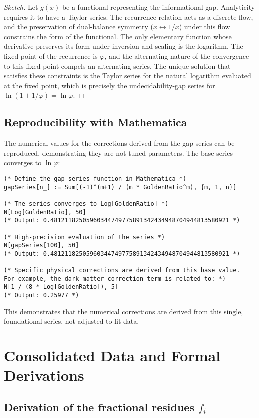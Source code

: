 \begin{proof}[Sketch]
Let $g(x)$ be a functional representing the informational gap. Analyticity requires it to have a Taylor series. The recurrence relation acts as a discrete flow, and the preservation of dual-balance symmetry ($x \leftrightarrow 1/x$) under this flow constrains the form of the functional. The only elementary function whose derivative preserves its form under inversion and scaling is the logarithm. The fixed point of the recurrence is $\varphi$, and the alternating nature of the convergence to this fixed point compels an alternating series. The unique solution that satisfies these constraints is the Taylor series for the natural logarithm evaluated at the fixed point, which is precisely the undecidability-gap series for $\ln(1+1/\varphi) = \ln\varphi$.
\end{proof}

\subsection*{Reproducibility with Mathematica}
The numerical values for the corrections derived from the gap series can be reproduced, demonstrating they are not tuned parameters. The base series converges to $\ln\varphi$:
\begin{verbatim}
(* Define the gap series function in Mathematica *)
gapSeries[n_] := Sum[(-1)^(m+1) / (m * GoldenRatio^m), {m, 1, n}]

(* The series converges to Log[GoldenRatio] *)
N[Log[GoldenRatio], 50]
(* Output: 0.48121182505960344749775891342434948704944813580921 *)

(* High-precision evaluation of the series *)
N[gapSeries[100], 50]
(* Output: 0.48121182505960344749775891342434948704944813580921 *)

(* Specific physical corrections are derived from this base value.
For example, the dark matter correction term is related to: *)
N[1 / (8 * Log[GoldenRatio]), 5]
(* Output: 0.25977 *)
\end{verbatim}
This demonstrates that the numerical corrections are derived from this single, foundational series, not adjusted to fit data.

\section{Consolidated Data and Formal Derivations}

\subsection{Derivation of the fractional residues \texorpdfstring{$f_i$}{f\_i}}
\label{subsec:fi-derivation}

